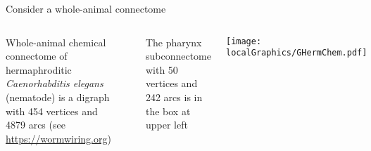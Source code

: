 \documentclass[usenames,dvipsnames,10pt,aspectratio=169]{beamer}
\begin{document}
\begin{frame}{Consider a whole-animal connectome}

\begin{columns}
Whole-animal chemical connectome of hermaphroditic \emph{Caenorhabditis elegans} (nematode) is a digraph with 454 vertices and 4879 arcs (see \url{https://wormwiring.org})

\

{\color{CatCapGold}The pharynx subconnectome with 50 vertices and 242 arcs is in the box at upper left}

\texttt{[image: localGraphics/GHermChem.pdf]}
\end{columns}
\end{frame}
\end{document}
